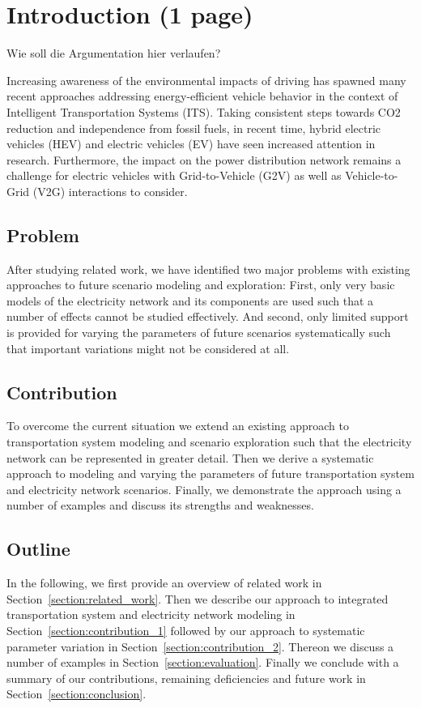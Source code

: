 \section{Introduction (1 page)}

{\color{red} Wie soll die Argumentation hier verlaufen?}

Increasing awareness of the environmental impacts of driving has spawned many recent approaches addressing energy-efficient vehicle behavior in the context of Intelligent Transportation Systems (ITS). Taking consistent steps towards CO2 reduction and independence from fossil fuels, in recent time, hybrid electric vehicles (HEV) and electric vehicles (EV) have seen increased attention in research. 
Furthermore, the impact on the power distribution network remains a challenge for electric vehicles with Grid-to-Vehicle (G2V) as well as Vehicle-to-Grid (V2G) interactions to consider.

\subsection{Problem}

After studying related work, we have identified two major problems with existing approaches to future scenario modeling and exploration: First, only very basic models of the electricity network and its components are used such that a number of effects cannot be studied effectively. And second, only limited support is provided for varying the parameters of future scenarios systematically such that important variations might not be considered at all.

\subsection{Contribution}

To overcome the current situation we extend an existing approach to transportation system modeling and scenario exploration such that the electricity network can be represented in greater detail. Then we derive a systematic approach to modeling and varying the parameters of future transportation system and electricity network scenarios. Finally, we demonstrate the approach using a number of examples and discuss its strengths and weaknesses.

\subsection{Outline}

In the following, we first provide an overview of related work in Section~\ref{section:related_work}. Then we describe our approach to integrated transportation system and electricity network modeling in Section~\ref{section:contribution_1} followed by our approach to systematic parameter variation in Section~\ref{section:contribution_2}. Thereon we discuss a number of examples in Section~\ref{section:evaluation}. Finally we conclude with a summary of our contributions, remaining deficiencies and future work in Section~\ref{section:conclusion}.